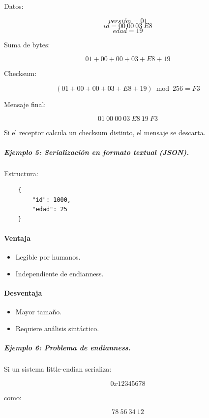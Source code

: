 \documentclass[12pt,twoside]{book}
\begin{document}
						Datos:
						
						\[
						versión = 01
						\]
						\[
						id = 00\ 00\ 03\ E8
						\]
						\[
						edad = 19
						\]
						
						Suma de bytes:
						
						\[
						01 + 00 + 00 + 03 + E8 + 19
						\]
						
						Checksum:
						
						\[
						(01 + 00 + 00 + 03 + E8 + 19) \bmod 256 = F3
						\]
						
						Mensaje final:
						
						\[
						01\ 00\ 00\ 03\ E8\ 19\ F3
						\]
						
						Si el receptor calcula un checksum distinto, el mensaje se descarta.
						
						\subparagraph{Ejemplo 5: Serialización en formato textual (JSON).} Estructura:
						
						\begin{lstlisting}
	{
		"id": 1000,
		"edad": 25
	} \end{lstlisting}
						
						\paragraph{Ventaja}
						
						\begin{itemize}
							\item Legible por humanos.
							\item Independiente de endianness.
						\end{itemize}
						
						\paragraph{Desventaja}
						
						\begin{itemize}
							\item Mayor tamaño.
							\item Requiere análisis sintáctico.
						\end{itemize}
						
						\subparagraph{Ejemplo 6: Problema de endianness.} Si un sistema little-endian serializa:
						
						\[
						0x12345678
						\]
						
						como:
						
						\[
						78\ 56\ 34\ 12
						\]
						
\end{document}
